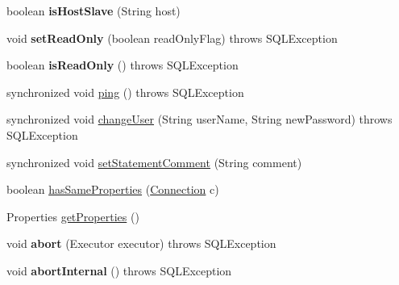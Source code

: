 \begin{DoxyCompactItemize}
boolean {\bfseries is\+Host\+Slave} (String host)
\item 
\mbox{\label{classcom_1_1mysql_1_1jdbc_1_1_replication_my_s_q_l_connection_a5329fa4bda26e2daa788c942c8ba09d8}} 
void {\bfseries set\+Read\+Only} (boolean read\+Only\+Flag)  throws S\+Q\+L\+Exception 
\item 
\mbox{\label{classcom_1_1mysql_1_1jdbc_1_1_replication_my_s_q_l_connection_ab03168e317a5dddfe74931f71bfcd50a}} 
boolean {\bfseries is\+Read\+Only} ()  throws S\+Q\+L\+Exception 
\item 
synchronized void \mbox{\hyperlink{classcom_1_1mysql_1_1jdbc_1_1_replication_my_s_q_l_connection_a2cf454e00e9fe6dcb74bb37405562e6d}{ping}} ()  throws S\+Q\+L\+Exception 
\item 
synchronized void \mbox{\hyperlink{classcom_1_1mysql_1_1jdbc_1_1_replication_my_s_q_l_connection_adf68b57206ecf667f69b8d6243ac50d7}{change\+User}} (String user\+Name, String new\+Password)  throws S\+Q\+L\+Exception 
\item 
synchronized void \mbox{\hyperlink{classcom_1_1mysql_1_1jdbc_1_1_replication_my_s_q_l_connection_aa7fc0fd1686f31130f8737f89087b8bd}{set\+Statement\+Comment}} (String comment)
\item 
boolean \mbox{\hyperlink{classcom_1_1mysql_1_1jdbc_1_1_replication_my_s_q_l_connection_a6add28fadea7fd82449464de48062955}{has\+Same\+Properties}} (\mbox{\hyperlink{interfacecom_1_1mysql_1_1jdbc_1_1_connection}{Connection}} c)
\item 
Properties \mbox{\hyperlink{classcom_1_1mysql_1_1jdbc_1_1_replication_my_s_q_l_connection_a93f7c5bbec567b742e4f9f94b81f1493}{get\+Properties}} ()
\item 
\mbox{\label{classcom_1_1mysql_1_1jdbc_1_1_replication_my_s_q_l_connection_a08c3f6b23d21b18a3ca7a5254472052b}} 
void {\bfseries abort} (Executor executor)  throws S\+Q\+L\+Exception 
\item 
\mbox{\label{classcom_1_1mysql_1_1jdbc_1_1_replication_my_s_q_l_connection_a5da5a98c07a6f85d0de565b138c8fde1}} 
void {\bfseries abort\+Internal} ()  throws S\+Q\+L\+Exception 
\item 

\end{DoxyCompactItemize}
